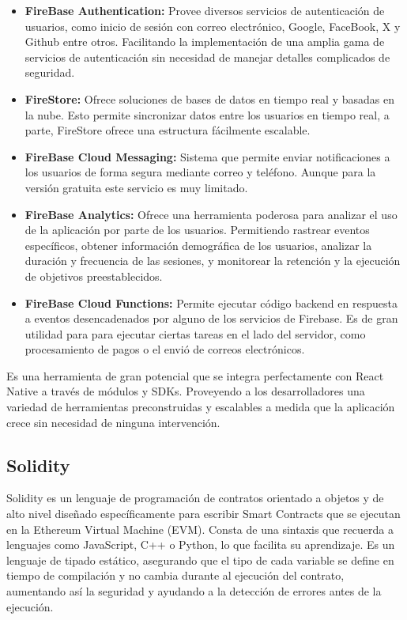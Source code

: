 \begin{itemize}

\item \textbf{FireBase Authentication:} Provee diversos servicios de autenticación de usuarios, como inicio de sesión con correo electrónico, Google, FaceBook, X y Github entre otros. Facilitando la implementación de una amplia gama de servicios de autenticación sin necesidad de manejar detalles complicados de seguridad.

\item \textbf{FireStore:} Ofrece soluciones de bases de datos en tiempo real y basadas en la nube. Esto permite sincronizar datos entre los usuarios en tiempo real, a parte, FireStore ofrece una estructura fácilmente escalable.

\item \textbf{FireBase Cloud Messaging:} Sistema que permite enviar notificaciones a los usuarios de forma segura mediante correo y teléfono. Aunque para la versión gratuita este servicio es muy limitado.

\item \textbf{FireBase Analytics:} Ofrece una herramienta poderosa para analizar el uso de la aplicación por parte de los usuarios.
Permitiendo rastrear eventos específicos, obtener información demográfica de los usuarios, analizar la duración y frecuencia de las sesiones, y monitorear la retención y la ejecución de objetivos preestablecidos.

\item \textbf{FireBase Cloud Functions:} Permite ejecutar código backend en respuesta a eventos desencadenados por alguno de los servicios de Firebase.
Es de gran utilidad para para ejecutar ciertas tareas en el lado del servidor, como procesamiento de pagos o el envió de correos electrónicos. 

\end{itemize}

Es una herramienta de gran potencial que se integra perfectamente con React Native a través de módulos y SDKs.
Proveyendo a los desarrolladores una variedad de herramientas preconstruidas y escalables a medida que la aplicación crece sin necesidad de ninguna intervención.


\subsection{Solidity}

Solidity es un lenguaje de programación de contratos orientado a objetos y de alto nivel diseñado específicamente para escribir Smart Contracts que se ejecutan en la Ethereum Virtual Machine (EVM). Consta de una sintaxis que recuerda a lenguajes como JavaScript, C++ o Python, lo que facilita su aprendizaje. 
Es un lenguaje de tipado estático, asegurando que el tipo de cada variable se define en tiempo de compilación y no cambia durante al ejecución del contrato, aumentando así la seguridad y ayudando a la detección de errores antes de la ejecución.

